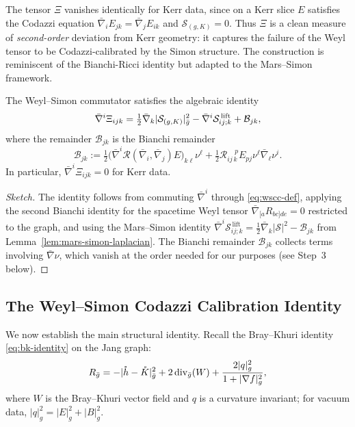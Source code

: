 \begin{remark}
The tensor $\Xi$ vanishes identically for Kerr data, since on a Kerr slice $E$ satisfies the Codazzi equation $\bar\nabla_i E_{jk}=\bar\nabla_j E_{ik}$ and $\mathcal{S}_{(g,K)}=0$. Thus $\Xi$ is a clean measure of \emph{second-order} deviation from Kerr geometry: it captures the failure of the Weyl tensor to be Codazzi-calibrated by the Simon structure. The construction is reminiscent of the Bianchi-Ricci identity but adapted to the Mars--Simon framework.
\end{remark}

\begin{lemma}\label{lem:bianchi-simon}
The Weyl--Simon commutator satisfies the algebraic identity
\begin{equation}\label{eq:bianchi-simon}
\bar\nabla^i\Xi_{ijk} = \tfrac{1}{2}\bar\nabla_k|\mathcal{S}_{(g,K)}|^2_{\bar{g}} - \bar\nabla^i\mathcal{S}_{ij;k}^{\,\mathrm{lift}} + \mathcal{B}_{jk},
\end{equation}
where the remainder $\mathcal{B}_{jk}$ is the Bianchi remainder
\[
\mathcal{B}_{jk} := \tfrac{1}{2}\bigl(\bar\nabla^i\mathcal{R}(\bar\nabla_i,\bar\nabla_j)E\bigr)_{k\ell}\nu^\ell + \tfrac{1}{2}\mathcal{R}_{ij\,k}^{\;\;\;\;p}E_{pj}\nu^\ell\bar\nabla_\ell\nu^i.
\]
In particular, $\bar\nabla^i\Xi_{ijk}=0$ for Kerr data.
\end{lemma}

\begin{proof}[Sketch]
The identity follows from commuting $\bar\nabla^i$ through \eqref{eq:wscc-def}, applying the second Bianchi identity for the spacetime Weyl tensor $\bar\nabla_{[a}R_{bc]de}=0$ restricted to the graph, and using the Mars--Simon identity $\bar\nabla^i\mathcal{S}_{ij;k}^{\,\mathrm{lift}} = \tfrac{1}{2}\bar\nabla_k|\mathcal{S}|^2 - \mathcal{B}_{jk}$ from Lemma~\ref{lem:mars-simon-laplacian}. The Bianchi remainder $\mathcal{B}_{jk}$ collects terms involving $\bar\nabla\nu$, which vanish at the order needed for our purposes (see Step~3 below).
\end{proof}

\subsection{The Weyl--Simon Codazzi Calibration Identity}

We now establish the main structural identity. Recall the Bray--Khuri identity \eqref{eq:bk-identity} on the Jang graph:
\begin{equation}\label{eq:bk-recall}
R_{\bar{g}} = -|\mathring{h}-\mathring{K}|^2_{\bar{g}} + 2\,\mathrm{div}_{\bar{g}}(W) + \frac{2|q|^2_g}{1+|\nabla f|^2_g},
\end{equation}
where $W$ is the Bray--Khuri vector field and $q$ is a curvature invariant; for vacuum data, $|q|^2_g = |E|^2_g+|B|^2_g$.

